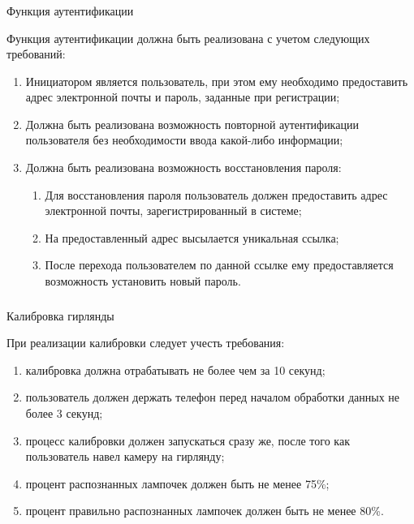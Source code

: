 \subsubsection{ } Функция аутентификации 
\label{sec:domain:specification:authentication}

Функция аутентификации должна быть реализована с учетом следующих требований:

\begin{enumerate}
	\item Инициатором является пользователь, при этом ему необходимо предоставить адрес электронной почты и пароль, заданные при регистрации;
	\item Должна быть реализована возможность повторной аутентификации пользователя без необходимости ввода какой-либо информации;
	\item Должна быть реализована возможность восстановления пароля:
	\begin{enumerate}
		\item Для восстановления пароля пользователь должен предоставить адрес электронной почты, зарегистрированный в системе;
		\item На предоставленный адрес высылается уникальная ссылка;
		\item После перехода пользователем по данной ссылке ему предоставляется возможность установить новый пароль.
	\end{enumerate}
\end{enumerate}

\subsubsection{ } Калибровка гирлянды
\label{sec:domain:specification:roles}

При реализации калибровки следует учесть требования:

\begin{enumerate}
	\item калибровка должна отрабатывать не более чем за 10 секунд;
	\item пользователь должен держать телефон перед началом обработки данных не более 3 секунд;
    \item процесс калибровки должен запускаться сразу же, после того как пользователь навел камеру на гирлянду;
	\item процент распознанных лампочек должен быть не менее 75\%;
	\item процент правильно распознанных лампочек должен быть не менее 80\%.
\end{enumerate}

